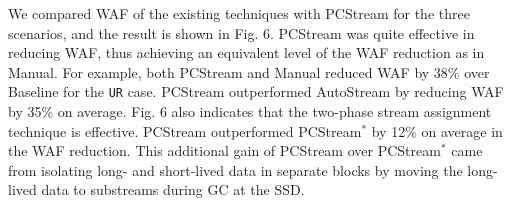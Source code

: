 We compared WAF of the existing techniques with \textsf{\small PCStream} for the three
scenarios, and the result is shown in Fig. 6.  
\textsf{\small PCStream} was quite effective in reducing WAF, 
thus achieving an equivalent level of the WAF reduction as in \textsf{\small Manual}.  
For example, both \textsf{\small PCStream} and \textsf{\small Manual} reduced WAF by 38\% over \textsf{\small Baseline} for the \texttt{UR} case. 
\textsf{\small PCStream} outperformed \textsf{\small AutoStream} by reducing WAF by 35\% on average.
Fig. 6 also indicates that the two-phase stream assignment technique is effective.  
\textsf{\small PCStream} outperformed \textsf{\small PCStream$^{*}$} by 12\% on average in the WAF reduction.
This additional gain of \textsf{\small PCStream} over \textsf{\small PCStream$^{*}$} came from isolating long- and short-lived data in separate blocks 
by moving the long-lived data to substreams during GC at the SSD.


